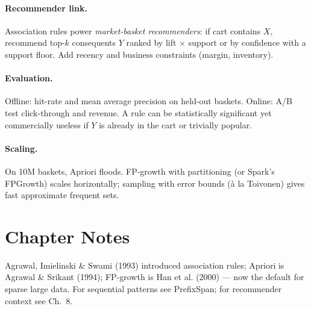 \paragraph{Recommender link.} Association rules power \emph{market-basket recommenders}: if cart contains $X$, recommend top-$k$ consequents $Y$ ranked by lift $\times$ support or by confidence with a support floor. Add recency and business constraints (margin, inventory).

\paragraph{Evaluation.} Offline: hit-rate and mean average precision on held-out baskets. Online: A/B test click-through and revenue. A rule can be statistically significant yet commercially useless if $Y$ is already in the cart or trivially popular.

\paragraph{Scaling.} On 10M baskets, Apriori floods. FP-growth with partitioning (or Spark's FPGrowth) scales horizontally; sampling with error bounds (\`a la Toivonen) gives fast approximate frequent sets.

\section{Chapter Notes}
Agrawal, Imielinski \& Swami (1993) introduced association rules; Apriori is Agrawal \& Srikant (1994); FP-growth is Han et al. (2000) --- now the default for sparse large data. For sequential patterns see PrefixSpan; for recommender context see Ch.~8.

